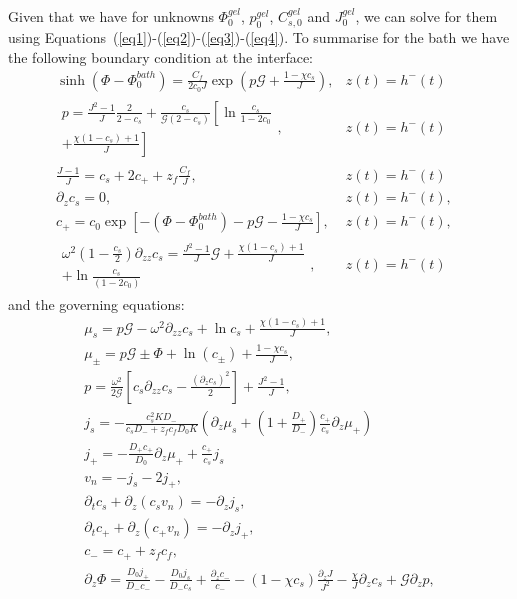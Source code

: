\documentclass[12pt]{extarticle}
\begin{document}
Given that we have for unknowns $\Phi^{gel}_0$, $p^{gel}_0$, $C^{gel}_{s,0}$ and $J^{gel}_0$, we can solve for them using Equations~(\ref{eq1})-(\ref{eq2})-(\ref{eq3})-(\ref{eq4}). 
To summarise for the bath we have the following boundary condition at the interface:
\begin{eqnarray}
\sinh(\Phi-\Phi_0^{bath})= \frac{C_f}{2c_0 J}\exp\left(p\mathcal{G}+\frac{1-\chi c_s}{J}\right), & z(t)=h^-(t)&\\
\begin{aligned}
p=\frac{J^2-1}{J}\frac{2}{2-c_s}+\frac{c_s}{\mathcal{G}(2-c_s)}\left[\ln\frac{c_s}{1-2c_0}\right.\\
\left.+\frac{\chi(1-c_s)+1}{J}\right]
\end{aligned},& z(t)=h^-(t)&\\
\frac{J-1}{J}=c_s+ 2c_++z_f\frac{C_f}{J}, & z(t)=h^-(t)&\\[4mm]
\partial_z c_{s}=0,&  z(t)=h^-(t),&\\[5mm]
c_{+} = c_0\exp\left[-(\Phi-\Phi_0^{bath})-p\mathcal{G}-\frac{1-\chi c_s}{J}\right], &z(t)=h^-(t),&\\
\begin{aligned}
\omega^2\left(1-\frac{c_s}{2}\right) \partial_{zz}c_s= \frac{J^2-1}{J} \mathcal{G} +\frac{\chi(1-c_s)+1}{J} \\
+ \ln \frac{c_s}{(1-2c_0)}  
\end{aligned}, & z(t)=h^-(t)&
\end{eqnarray}
and the governing equations:
\begin{gather}
\mu_s = p \mathcal{G}  - \omega^2\partial_{zz} c_s+ \ln c_s+\frac{\chi(1-c_s)+1}{J},\\
\mu_\pm = p \mathcal{G} \pm \Phi + \ln (c_\pm) +\frac{1-\chi c_s}{J} ,\\
p=\frac{\omega^2}{2\mathcal{G}} \left[c_s\partial_{zz}c_s-\frac{(\partial_z c_s)^2}{2}\right]+ \frac{J^2-1}{J},\\
j_s =-\frac{c^2_sKD_-}{c_sD_-+z_fc_fD_0K}  \left(\partial_z\mu_s +\left(1+\frac{D_+}{D_-}\right)\frac{c_+}{c_s}\partial_z\mu_+\right)\\
j_+= - \frac{D_+ c_+}{D_0}\partial_z \mu_+ + \frac{c_+}{c_s}j_s\\
v_n = - j_s-2j_+,\\
\partial_t c_s + \partial_z (c_s v_n)=- \partial_z j_s,\\
\partial_t c_+ +\partial_z (c_+ v_n)= -\partial_zj_+,\\
c_-=c_++z_fc_f,\\
\partial_z \Phi = \frac{D_0 j_+}{D_-c_-}- \frac{D_0 j_s}{D_-c_s} + \frac{\partial_z c_-}{c_-}-(1-\chi c_s)\frac{\partial_z J}{J^2}-\frac{\chi}{J}\partial_z c_s+\mathcal{G}\partial_z p,
\end{gather}
\end{document}

